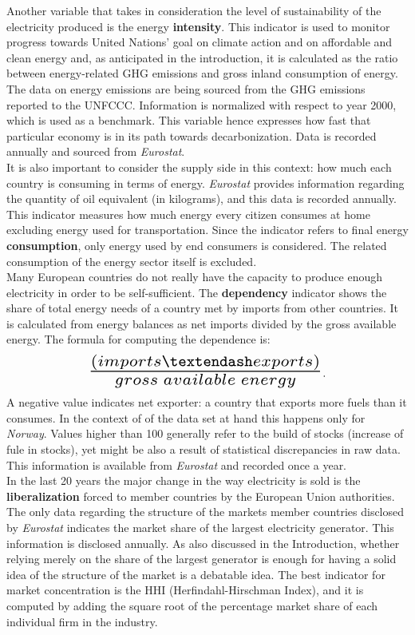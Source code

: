 \documentclass{book}
\begin{document}
\noindent Another variable that takes in consideration the level of sustainability of the electricity produced is the energy \textbf{intensity}. This indicator is used to monitor progress towards United Nations' goal on climate action and on affordable and clean energy and, as anticipated in the introduction, it is calculated as the ratio between energy-related GHG emissions and gross inland consumption of energy. The data on energy emissions are being sourced from the GHG emissions reported to the UNFCCC. Information is normalized with respect to year 2000, which is used as a benchmark. This variable hence expresses how fast that particular economy is in its path towards decarbonization. Data is recorded annually and sourced from \textit{Eurostat}.\\

\noindent It is also important to consider the supply side in this context: how much each country is consuming in terms of energy. \textit{Eurostat} provides information regarding the quantity of oil equivalent (in kilograms), and this data is recorded annually. This indicator measures how much energy every citizen consumes at home excluding energy used for transportation. Since the indicator refers to final energy \textbf{consumption}, only energy used by end consumers is considered. The related consumption of the energy sector itself is excluded.\\

\noindent Many European countries do not really have the capacity to produce enough electricity in order to be self-sufficient. The \textbf{dependency} indicator shows the share of total energy needs of a country met by imports from other countries. It is calculated from energy balances as net imports divided by the gross available energy. The formula for computing the dependence is: $$ \scalebox{2} {$\frac{(imports – exports)}{gross\;available\;energy}$}.$$ A negative value indicates net exporter: a country that exports more fuels than it consumes. In the context of of the data set at hand this happens only for \textit{Norway}. Values higher than 100 generally refer to the build of stocks (increase of fule in stocks), yet might be also a result of statistical discrepancies in raw data. This information is available from \textit{Eurostat} and recorded once a year.\\

\noindent In the last 20 years the major change in the way electricity is sold is the \textbf{liberalization} forced to member countries by the European Union authorities. The only data regarding the structure of the markets member countries disclosed by \textit{Eurostat} indicates the market share of the largest electricity generator. This information is disclosed annually. As also discussed in the Introduction, whether relying merely on the share of the largest generator is enough for having a solid idea of the structure of the market is a debatable idea. The best indicator for market concentration is the HHI (Herfindahl-Hirschman Index), and it is computed by adding the square root of the percentage market share of each individual firm in the industry.\\
\end{document}
